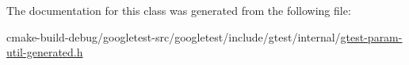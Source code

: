 The documentation for this class was generated from the following file\+:\begin{DoxyCompactItemize}
\item 
cmake-\/build-\/debug/googletest-\/src/googletest/include/gtest/internal/\mbox{\hyperlink{gtest-param-util-generated_8h}{gtest-\/param-\/util-\/generated.\+h}}\end{DoxyCompactItemize}
